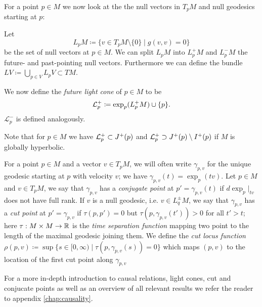 For a point $p\in M$ we now look at the the null vectors in $T_pM$ and null geodesics starting at $p$:
\begin{definition}\label{def:lightcone}
    Let 
    \[
    L_pM \coloneqq \{ v\in T_pM\setminus\{0\} \mid g(v,v)=0 \}
    \]
    be the set of null vectors at $p\in M$. We can split $L_pM$ into $L^+_pM$ and $L^-_pM$ the future- and past-pointing null vectors. Furthermore we can define the bundle $LV\coloneqq\bigcup_{p\in V}L_pV\subset TM$.
    
    We now define the \emph{future light cone} of $p\in M$ to be 
    \[
    \mathcal{L}^+_p \coloneqq \exp_p(L^+_pM) \cup \{p\}.
    \]
    $\mathcal{L}^-_p$ is defined analogously.


    Note that for $p\in M$ we have ${\mathcal{L}}^+_p\subset J^+(p)$ and ${\mathcal{L}}^+_p\supset J^+(p)\setminus I^+(p)$ if $M$ is globally hyperbolic.
\end{definition}

For a point $p\in M$ and a vector $v\in T_pM$, we will often write $\gamma_{p,v}$ for the unique geodesic starting at $p$ with velocity $v$; we have $\gamma_{p,v}(t)=\exp_p(tv)$.
Let $p\in M$ and $v\in T_pM$, we say that $\gamma_{p,v}$ has a \emph{conjugate point} at $p'=\gamma_{p,v}(t)$ if $d\exp_p\rvert_{tv}$ does not have full rank. If $v$ is a null geodesic, i.e. $v\in L^\pm_qM$, we say that $\gamma_{p,v}$ has a \emph{cut point} at $p'=\gamma_{p,v}$ if $\tau(p,p')=0$ but $\tau(p,\gamma_{p,v}(t'))>0$ for all $t'>t$; here $\tau:M\times M\to \mathbb{R}$ is the \emph{time separation function} mapping two point to the length of the maximal geodesic joining them. We define the \emph{cut locus function} $
\rho(p,v)\coloneqq\sup\{s\in[0,\infty) \mid \tau(p,\gamma_{p,v}(s))=0\}$ which maps $(p,v)$ to the location of the first cut point along $\gamma_{p,v}$

For a more in-depth introduction to causal relations, light cones, cut and conjucate points as well as an overview of all relevant results we refer the reader to appendix \ref{chap:causality}.

